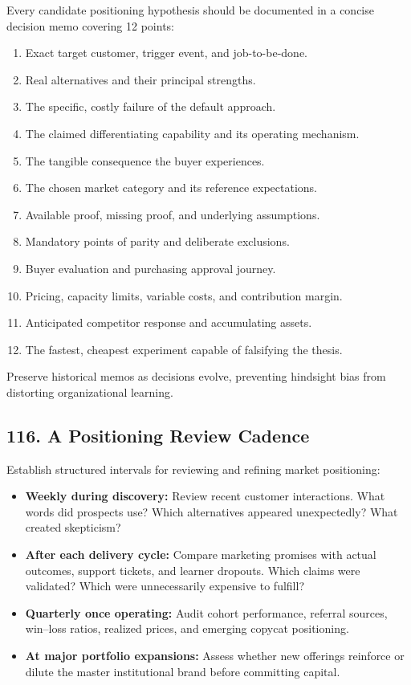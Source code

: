 Every candidate positioning hypothesis should be documented in a concise decision memo covering 12 points:
\begin{enumerate}
    \item Exact target customer, trigger event, and job-to-be-done.
    \item Real alternatives and their principal strengths.
    \item The specific, costly failure of the default approach.
    \item The claimed differentiating capability and its operating mechanism.
    \item The tangible consequence the buyer experiences.
    \item The chosen market category and its reference expectations.
    \item Available proof, missing proof, and underlying assumptions.
    \item Mandatory points of parity and deliberate exclusions.
    \item Buyer evaluation and purchasing approval journey.
    \item Pricing, capacity limits, variable costs, and contribution margin.
    \item Anticipated competitor response and accumulating assets.
    \item The fastest, cheapest experiment capable of falsifying the thesis.
\end{enumerate}

Preserve historical memos as decisions evolve, preventing hindsight bias from distorting organizational learning.

\subsection*{116. A Positioning Review Cadence}

Establish structured intervals for reviewing and refining market positioning:
\begin{itemize}
    \item \textbf{Weekly during discovery:} Review recent customer interactions. What words did prospects use? Which alternatives appeared unexpectedly? What created skepticism?
    \item \textbf{After each delivery cycle:} Compare marketing promises with actual outcomes, support tickets, and learner dropouts. Which claims were validated? Which were unnecessarily expensive to fulfill?
    \item \textbf{Quarterly once operating:} Audit cohort performance, referral sources, win--loss ratios, realized prices, and emerging copycat positioning.
    \item \textbf{At major portfolio expansions:} Assess whether new offerings reinforce or dilute the master institutional brand before committing capital.
\end{itemize}

